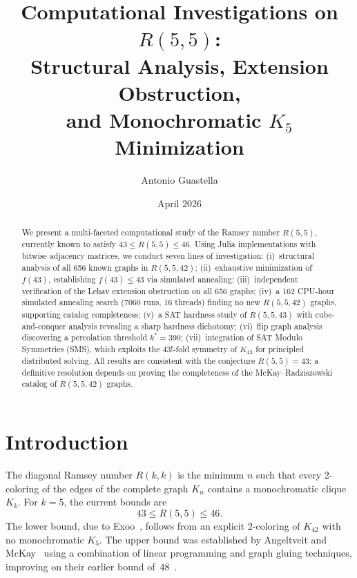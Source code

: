 \documentclass[11pt,a4paper]{article}
\title{Computational Investigations on $R(5,5)$:\\
Structural Analysis, Extension Obstruction,\\and Monochromatic $K_5$ Minimization}
\author{Antonio Guastella}
\date{April 2026}
\theoremstyle{definition}
\theoremstyle{remark}
\newcommand{\Kn}[1]{K_{#1}}
\newcommand{\Rset}[3]{R(#1,#2,#3)}
\begin{document}
\maketitle

\begin{abstract}
We present a multi-faceted computational study of the Ramsey number
$R(5,5)$, currently known to satisfy $43 \leq R(5,5) \leq 46$.
Using Julia implementations with bitwise adjacency matrices,
we conduct seven lines of investigation:
(i)~structural analysis of all 656 known graphs in $\Rset{5}{5}{42}$;
(ii)~exhaustive minimization of $f(43)$, establishing
$f(43) \leq 43$ via simulated annealing;
(iii)~independent verification of the Lehav extension obstruction
on all 656 graphs;
(iv)~a 162 CPU-hour simulated annealing search (7060 runs, 16 threads)
finding no new $\Rset{5}{5}{42}$ graphs, supporting catalog completeness;
(v)~a SAT hardness study of $R(5,5,43)$ with cube-and-conquer
analysis revealing a sharp hardness dichotomy;
(vi)~flip graph analysis discovering a percolation threshold $k^* = 390$;
(vii)~integration of SAT Modulo Symmetries (SMS), which exploits the
$43!$-fold symmetry of $K_{43}$ for principled distributed solving.
All results are consistent with the conjecture $R(5,5) = 43$;
a definitive resolution depends on proving the completeness of
the McKay--Radziszowski catalog of $\Rset{5}{5}{42}$ graphs.
\end{abstract}

\tableofcontents

\section{Introduction}
\label{sec:intro}

The diagonal Ramsey number $R(k,k)$ is the minimum $n$ such that
every 2-coloring of the edges of the complete graph $\Kn{n}$
contains a monochromatic clique $K_k$.
For $k=5$, the current bounds are
\begin{equation}
  43 \leq R(5,5) \leq 46.
  \label{eq:bounds}
\end{equation}
The lower bound, due to Exoo~\cite{Exoo1989}, follows from an
explicit 2-coloring of $\Kn{42}$ with no monochromatic $K_5$.
The upper bound was established by
Angeltveit and McKay~\cite{AngeltveitMcKay2024} using a combination
of linear programming and graph gluing techniques, improving on
their earlier bound of~48~\cite{AngeltveitMcKay2017}.
\end{document}
